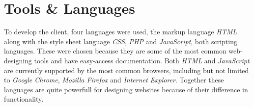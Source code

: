 \chapter{Tools \& Languages}

To develop the client, four languages were used, the markup language \textit{HTML} along with the style sheet language \textit{CSS}, \textit{PHP} and \textit{JavaScript}, both scripting languages. These were chosen because they are some of the most common web-designing tools and have easy-access documentation. Both \textit{HTML} and \textit{JavaScript} are currently supported by the most common browsers, including but not limited to \textit{Google Chrome}, \textit{Mozilla Firefox} and \textit{Internet Explorer}.
Together these languages are quite powerfull for designing websites because of their difference in functionality.